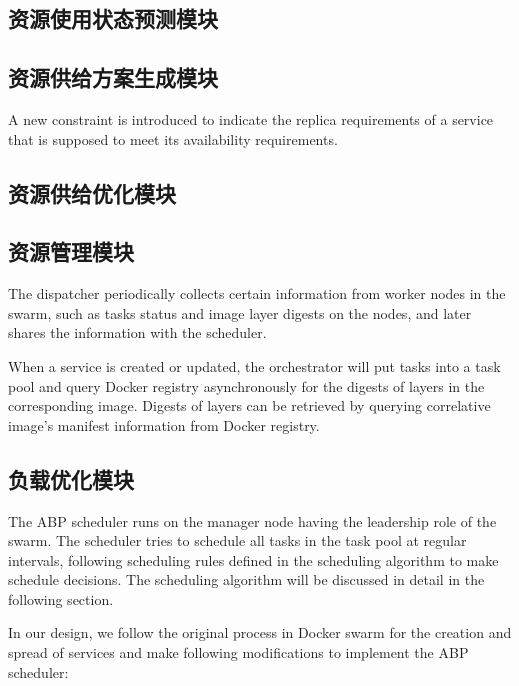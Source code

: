 \subsection{资源使用状态预测模块}

\subsection{资源供给方案生成模块}

A new constraint is introduced to indicate the replica requirements of a service that is supposed to meet its availability requirements. 

\subsection{资源供给优化模块}

\subsection{资源管理模块}

The dispatcher periodically collects certain information from worker nodes in the swarm, such as tasks status and image layer digests on the nodes, and later shares the information with the scheduler.

When a service is created or updated, the orchestrator will put tasks into a task pool and query Docker registry asynchronously for the digests of layers in the corresponding image. Digests of layers can be retrieved by querying correlative image's manifest information from Docker registry.

\subsection{负载优化模块}
The ABP scheduler runs on the manager node having the leadership role of the swarm. The scheduler tries to schedule all tasks in the task pool at regular intervals, following scheduling rules defined in the scheduling algorithm to make schedule decisions. The scheduling algorithm will be discussed in detail in the following section.

In our design, we follow the original process in Docker swarm for the creation and spread of services and make following modifications to implement the ABP scheduler: 

